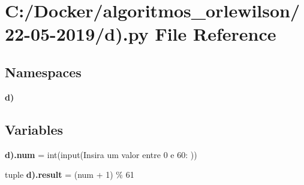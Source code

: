 \section{C\+:/\+Docker/algoritmos\+\_\+orlewilson/22-\/05-\/2019/d).py File Reference}
\label{d_08_8py}
\subsection*{Namespaces}
\begin{DoxyCompactItemize}
\item 
 \textbf{ d)}
\end{DoxyCompactItemize}
\subsection*{Variables}
\begin{DoxyCompactItemize}
\item 
\textbf{ d).\+num} = int(input(\textquotesingle{}Insira um valor entre 0 e 60\+: \textquotesingle{}))
\item 
tuple \textbf{ d).\+result} = (num + 1) \% 61
\end{DoxyCompactItemize}
